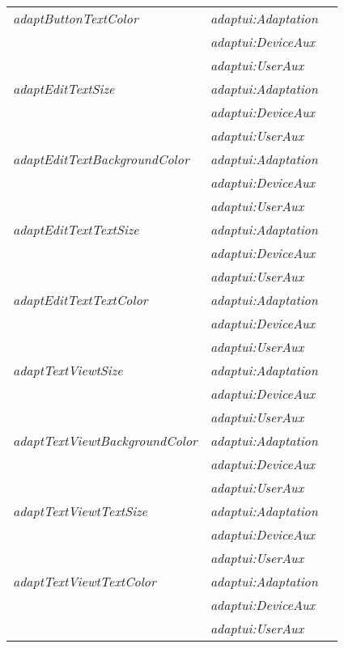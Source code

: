 \begin{table}
\begin{tabular}{l l l}
  \textit{adaptButtonTextColor}	& \textit{adaptui:Adaptation}	& 				\\
				& \textit{adaptui:DeviceAux}	& 				\\
				& \textit{adaptui:UserAux}	& 				\\
  \hline
  \textit{adaptEditTextSize}	& \textit{adaptui:Adaptation}	& 				\\
				& \textit{adaptui:DeviceAux}	& 				\\
				& \textit{adaptui:UserAux}	& 				\\
  \textit{adaptEditTextBackgroundColor}	& \textit{adaptui:Adaptation}	& 			\\
				& \textit{adaptui:DeviceAux}	& 				\\
				& \textit{adaptui:UserAux}	& 				\\
  \textit{adaptEditTextTextSize}& \textit{adaptui:Adaptation}	& 				\\
				& \textit{adaptui:DeviceAux}	& 				\\
				& \textit{adaptui:UserAux}	& 				\\
  \textit{adaptEditTextTextColor}& \textit{adaptui:Adaptation}	& 				\\
				& \textit{adaptui:DeviceAux}	& 				\\
				& \textit{adaptui:UserAux}	& 				\\
  \hline 
  \textit{adaptTextViewtSize}	& \textit{adaptui:Adaptation}	& 				\\
				& \textit{adaptui:DeviceAux}	& 				\\
				& \textit{adaptui:UserAux}	& 				\\
  \textit{adaptTextViewtBackgroundColor}& \textit{adaptui:Adaptation}	& 			\\
				& \textit{adaptui:DeviceAux}	& 				\\
				& \textit{adaptui:UserAux}	& 				\\
  \textit{adaptTextViewtTextSize}& \textit{adaptui:Adaptation}	& 				\\
				& \textit{adaptui:DeviceAux}	& 				\\
				& \textit{adaptui:UserAux}	& 				\\
  \textit{adaptTextViewtTextColor}& \textit{adaptui:Adaptation}	& 				\\
				& \textit{adaptui:DeviceAux}	& 				\\
				& \textit{adaptui:UserAux}	& 				\\
  \hline 
\end{tabular}
\end{table}

